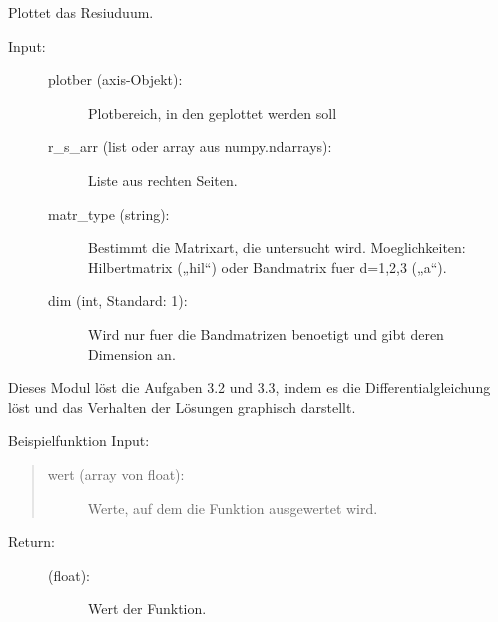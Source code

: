 \documentclass[letterpaper,10pt,ngerman]{sphinxmanual}
\begin{document}
\begin{fulllineitems}
\label{\detokenize{index:aufg_3_4_main.plot_res}}
Plottet das  Resiuduum.
\begin{description}
\item[{Input:}] \leavevmode\begin{description}
\item[{plotber (axis-Objekt):}] \leavevmode
Plotbereich, in den geplottet werden soll

\item[{r\_s\_arr (list oder array aus numpy.ndarrays):}] \leavevmode
Liste aus rechten Seiten.

\item[{matr\_type (string):}] \leavevmode
Bestimmt die Matrixart, die untersucht wird.
Moeglichkeiten: Hilbertmatrix („hil“) oder
Bandmatrix fuer d=1,2,3 („a“).

\item[{dim (int, Standard: 1):}] \leavevmode
Wird nur fuer die Bandmatrizen benoetigt und gibt deren Dimension an.

\end{description}

\end{description}

\end{fulllineitems}

\label{\detokenize{index:module-aufg_3_2u3_main}}
Dieses Modul löst die Aufgaben 3.2 und 3.3, indem es die Differentialgleichung löst und
das Verhalten der Lösungen graphisch darstellt.

\begin{fulllineitems}
\label{\detokenize{index:aufg_3_2u3_main.fntn}}
Beispielfunktion
Input:
\begin{quote}
\begin{description}
\item[{wert (array von float):}] \leavevmode
Werte, auf dem die Funktion ausgewertet wird.

\end{description}
\end{quote}
\begin{description}
\item[{Return:}] \leavevmode\begin{description}
\item[{(float):}] \leavevmode
Wert der Funktion.

\end{description}

\end{description}

\end{fulllineitems}
\end{document}
